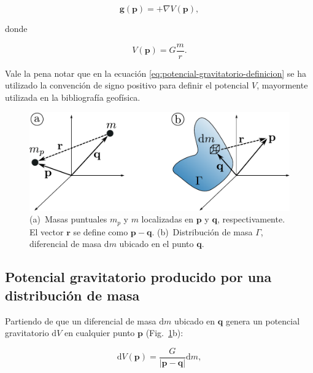 \begin{equation}
    \mathbf{g}(\mathbf{p}) = + \nabla V(\mathbf{p}),
    \label{eq:potencial-gravitatorio-definicion}
\end{equation}

\noindent donde

\begin{equation}
    V(\mathbf{p}) = G \frac{m}{r}.
\end{equation}

\noindent Vale la pena notar que en la ecuación
\ref{eq:potencial-gravitatorio-definicion} se ha utilizado la convención de
signo positivo para definir el potencial $V$, mayormente utilizada en la
bibliografía geofísica.

\begin{figure}
    \centering
    \includegraphics[width=\linewidth]{figs/gravity-potentials.pdf}
    \caption{
        (a)~Masas puntuales $m_p$ y $m$ localizadas en $\mathbf{p}$
        y $\mathbf{q}$, respectivamente. El vector $\mathbf{r}$ se define como
        $\mathbf{p} - \mathbf{q}$.
        (b)~Distribución de masa $\Gamma$, diferencial de masa $\text{d}m$
        ubicado en el punto $\mathbf{q}$.
    }
    \label{fig:potencial-gravitatorio}
\end{figure}

\subsection{Potencial gravitatorio producido por una distribución de masa}

Partiendo de que un diferencial de masa $\text{d}m$ ubicado en $\mathbf{q}$
genera un potencial gravitatorio $\text{d}V$ en cualquier punto $\mathbf{p}$
(Fig.~\ref{fig:potencial-gravitatorio}b):

\begin{equation}
    \text{d}V(\mathbf{p}) = \frac{G}{|\mathbf{p} - \mathbf{q}|} \text{d}m,
\end{equation}

